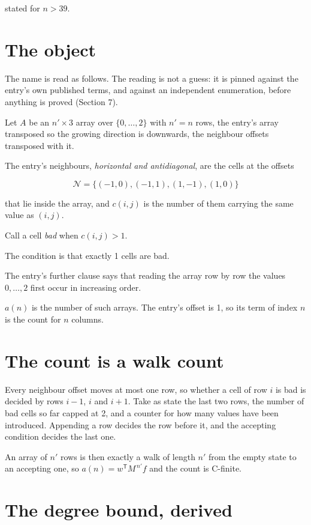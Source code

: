 \documentclass[11pt]{article}
\theoremstyle{definition}
\begin{document}
stated for $n > 39$.

\section{The object}

The name is read as follows. The reading is not a guess: it is pinned against the entry's own published terms, and against an independent enumeration, before anything is proved (Section 7).

Let $A$ be an $n' \times 3$ array over $\{0,\dots,2\}$ with $n' = n$ rows, the entry's array transposed so the growing direction is downwards, the neighbour offsets transposed with it.

The entry's neighbours, {\itshape horizontal and antidiagonal}, are the cells at the offsets

\[\mathcal{N} = \{(-1,0), (-1,1), (1,-1), (1,0)\}\]

that lie inside the array, and $c(i,j)$ is the number of them carrying the same value as $(i,j)$.

Call a cell {\itshape bad} when $c(i,j) > 1$.

The condition is that exactly 1 cells are bad.

The entry's further clause says that reading the array row by row the values $0,\dots,2$ first occur in increasing order.

$a(n)$ is the number of such arrays. The entry's offset is 1, so its term of index $n$ is the count for $n$ columns.

\section{The count is a walk count}

Every neighbour offset moves at most one row, so whether a cell of row $i$ is bad is decided by rows $i-1$, $i$ and $i+1$. Take as state the last two rows, the number of bad cells so far capped at 2, and a counter for how many values have been introduced. Appending a row decides the row before it, and the accepting condition decides the last one.

An array of $n'$ rows is then exactly a walk of length $n'$ from the empty state to an accepting one, so $a(n) = w^{\mathsf T}M^{\,n'}f$ and the count is C-finite.

\section{The degree bound, derived}
\end{document}

